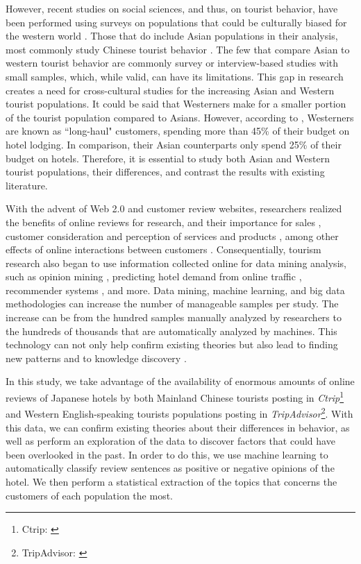 \documentclass[smallextended,natbib]{svjour3}       %
\begin{document}
However, recent studies on social sciences, and thus, on tourist behavior, have been performed using surveys on populations that could be culturally biased for the western world \cite[][]{nielsen2017, jones2010WEIRD, guaratne2009, hogan1978biases}. Those that do include Asian populations in their analysis, most commonly study Chinese tourist behavior \cite[e.g.][]{liu2019, chang2010, dongyang2015}.  The few that compare Asian to western tourist behavior \cite[e.g.][]{choi2000} are commonly survey or interview-based studies with small samples, which, while valid, can have its limitations. This gap in research creates a need for cross-cultural studies for the increasing Asian and Western tourist populations. It could be said that Westerners make for a smaller portion of the tourist population compared to Asians. However, according to \cite{choi2000}, Westerners are known as ``long-haul" customers, spending more than 45\% of their budget on hotel lodging. In comparison, their Asian counterparts only spend 25\% of their budget on hotels. Therefore, it is essential to study both Asian and Western tourist populations, their differences, and contrast the results with existing literature. 

With the advent of Web 2.0 and customer review websites, researchers realized the benefits of online reviews for research, and their importance for sales  \cite[][]{ye2009, basuroy2003}, customer consideration \cite[][]{vermeulen2009} and perception of services and products \cite[][]{browning2013}, among other effects of online interactions between customers \cite[e.g.][]{xiang2010, ren2019}. Consequentially, tourism research also began to use information collected online for data mining analysis, such as opinion mining \cite[e.g.][]{hu2017436}, predicting hotel demand from online traffic \cite[][]{yang2014}, recommender systems \cite[e.g.][]{loh2003}, and more. Data mining, machine learning, and big data methodologies can increase the number of manageable samples per study. The increase can be from the hundred samples manually analyzed by researchers to the hundreds of thousands that are automatically analyzed by machines. This technology can not only help confirm existing theories but also lead to finding new patterns and to knowledge discovery \cite[][]{fayyad1996data}. 

In this study, we take advantage of the availability of enormous amounts of online reviews of Japanese hotels by both Mainland Chinese tourists posting in \textit{Ctrip}\footnote{\label{ctrip}Ctrip: \href {www.ctrip.com/}{}} and Western English-speaking tourists populations posting in \textit{TripAdvisor}\footnote{\label{tripadvisor}TripAdvisor: \href {www.tripadvisor.com/}{}}. With this data, we can confirm existing theories about their differences in behavior, as well as perform an exploration of the data to discover factors that could have been overlooked in the past. In order to do this, we use machine learning to automatically classify review sentences as positive or negative opinions of the hotel. We then perform a statistical extraction of the topics that concerns the customers of each population the most.
\end{document}
